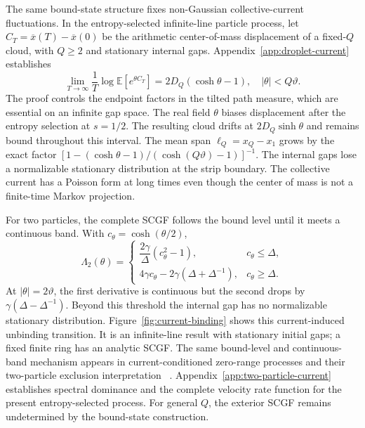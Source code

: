 \documentclass[aps,pre,reprint,amsmath,amssymb,longbibliography,floatfix]{revtex4-2}
\newcommand{\E}{\mathbb E}
\begin{document}
The same bound-state structure fixes non-Gaussian collective-current
fluctuations. In the entropy-selected infinite-line particle process,
let $C_T=\overline x(T)-\overline x(0)$ be the arithmetic center-of-mass
displacement of a fixed-$Q$ cloud, with $Q\ge2$ and stationary internal
gaps. Appendix~\ref{app:droplet-current}
establishes
\begin{equation}
 \lim_{T\to\infty}\frac1T\log\E\left[e^{\theta C_T}\right]
 =2D_Q(\cosh\theta-1),\quad |\theta|<Q\vartheta .
 \label{eq:droplet-current-main}
\end{equation}
The proof controls the endpoint factors in the tilted path measure,
which are essential on an infinite gap space. The real field $\theta$ biases displacement after the entropy selection
at $s=1/2$. The resulting cloud drifts at $2D_Q\sinh\theta$ and remains
bound throughout this interval. The mean span $\ell_Q=x_Q-x_1$ grows by the exact factor
$\left[1-(\cosh\theta-1)/(\cosh(Q\vartheta)-1)\right]^{-1}$.
The internal gaps lose a normalizable stationary distribution at the
strip boundary. The collective current has a Poisson form at
long times even though the center of mass is not a finite-time Markov
projection.

For two particles, the complete SCGF follows the bound level until it
meets a continuous band. With $c_\theta=\cosh(\theta/2)$,
\begin{equation}
 \Lambda_2(\theta)=
 \begin{cases}
 \dfrac{2\gamma}{\Delta}(c_\theta^2-1),&c_\theta\le\Delta,\\[2pt]
 4\gamma c_\theta-2\gamma(\Delta+\Delta^{-1}),&c_\theta\ge\Delta.
 \end{cases}\label{eq:two-particle-full-SCGF}
\end{equation}
At $|\theta|=2\vartheta$, the first derivative is continuous but the
second drops by $\gamma(\Delta-\Delta^{-1})$. Beyond this threshold the
internal gap has no normalizable stationary distribution. Figure~\ref{fig:current-binding}
shows this current-induced unbinding transition. It is an infinite-line
result with stationary initial gaps; a fixed finite ring has an analytic
SCGF. The same bound-level and continuous-band mechanism appears in
current-conditioned zero-range processes and their two-particle
exclusion interpretation ~\cite{RakosHarris2008}. Appendix~\ref{app:two-particle-current}
establishes spectral dominance and the complete velocity rate function
for the present entropy-selected process. For general $Q$, the exterior
SCGF remains undetermined by the bound-state construction.
\end{document}

